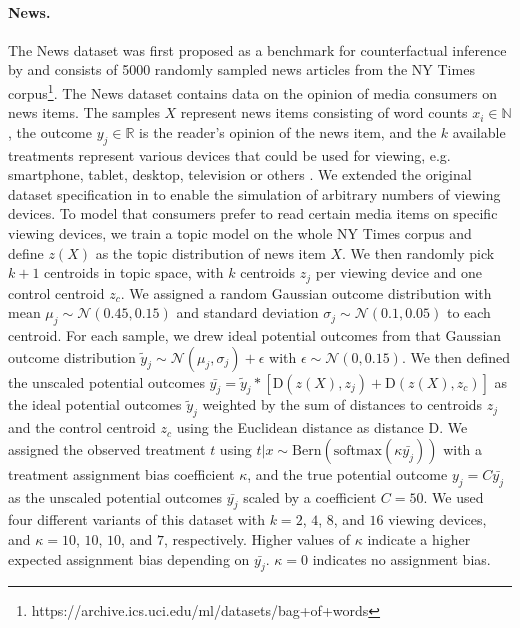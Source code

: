 \documentclass{article}
\begin{document}
\paragraph{News.} The News dataset was first proposed as a benchmark for counterfactual inference by \citet{johansson2016learning} and consists of 5000 randomly sampled news articles from the NY Times corpus\footnote{https://archive.ics.uci.edu/ml/datasets/bag+of+words}. The News dataset contains data on the opinion of media consumers on news items. The samples $X$ represent news items consisting of word counts $x_i \in \mathbb{N}$, the outcome $y_j \in \mathbb{R}$ is the reader's opinion of the news item, and the $k$ available treatments represent various devices that could be used for viewing, e.g. smartphone, tablet, desktop, television or others \cite{johansson2016learning}. We extended the original dataset specification in \cite{johansson2016learning} to enable the simulation of arbitrary numbers of viewing devices. To model that consumers prefer to read certain media items on specific viewing devices, we train a topic model on the whole NY Times corpus and define $z(X)$ as the topic distribution of news item $X$. We then randomly pick $k+1$ centroids in topic space, with $k$ centroids $z_j$ per viewing device and one control centroid $z_c$. We assigned a random Gaussian outcome distribution with mean $\mu_{j} \sim \mathcal{N}(0.45, 0.15)$ and standard deviation $\sigma_{j} \sim \mathcal{N}(0.1,0.05)$ to each centroid. For each sample, we drew ideal potential outcomes from that Gaussian outcome distribution $\tilde{y}_j \sim \mathcal{N}(\mu_j, \sigma_j) + \epsilon$ with $\epsilon \sim \mathcal{N}(0, 0.15)$. We then defined the unscaled potential outcomes $\bar{y_j} = \tilde{y}_j*[\text{D}(z(X), z_j) + \text{D}(z(X), z_c)]$ as the ideal potential outcomes $\tilde{y}_j$ weighted by the sum of distances to centroids $z_j$ and the control centroid $z_c$ using the Euclidean distance as distance $\text{D}$. We assigned the observed treatment $t$ using $t|x \sim \text{Bern}(\text{softmax}(\kappa \bar{y_j}))$ with a treatment assignment bias coefficient $\kappa$, and the true potential outcome $y_j = C\bar{y_j}$ as the unscaled potential outcomes $\bar{y_j}$ scaled by a  coefficient $C=50$. We used four different variants of this dataset with $k=2$, $4$, $8$, and $16$ viewing devices, and $\kappa = 10$, $10$, $10$, and $7$, respectively. Higher values of $\kappa$ indicate a higher expected assignment bias depending on $\bar{y_j}$. $\kappa = 0$ indicates no assignment bias. 
\end{document}
